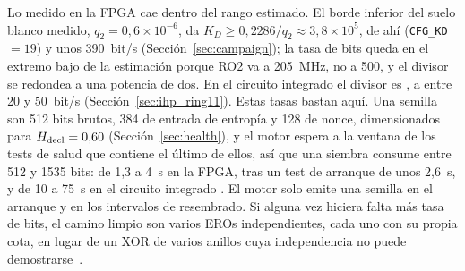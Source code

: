 Lo medido en la \ac{FPGA} cae dentro del rango estimado. El
borde inferior del suelo blanco medido, $q_2 = 0{,}6\times10^{-6}$, da
$K_D \ge 0{,}2286 / q_2 \approx 3{,}8\times10^{5}$, de ahí 
(\texttt{CFG\_KD} $= 19$) y unos 390~bit/s \meas{}
(Sección~\ref{sec:campaign}); la tasa de bits queda en el extremo bajo de
la estimación porque RO2 va a 205~MHz, no a 500, y el divisor se redondea
a una potencia de dos. En el circuito integrado el divisor es
, a entre 20 y 50~bit/s \est{} (Sección~\ref{sec:ihp_ring11}).
Estas tasas bastan aquí. Una semilla son 512 bits brutos, 384 de entrada
de entropía y 128 de nonce, dimensionados para $H_{\mathrm{decl}} = 0{,}60$
(Sección~\ref{sec:health}), y el motor espera a la ventana de los tests de
salud que contiene el último de ellos, así que una siembra consume entre
512 y 1535 bits: de 1,3 a 4~s en la \ac{FPGA}, tras un test de arranque
de unos 2,6~s, y de 10 a 75~s en el circuito integrado \est{}. El motor
solo emite una semilla en el arranque y en los intervalos de
resembrado. Si alguna vez hiciera falta más tasa de bits, el camino limpio
son varios \acp{ERO} independientes, cada uno con su propia cota, en lugar
de un XOR de varios anillos cuya independencia no puede
demostrarse~\cite{bochard_2010_true}.
